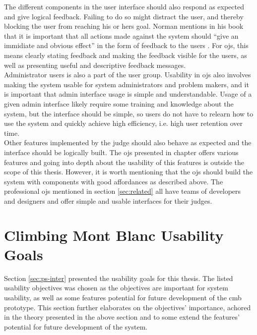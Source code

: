 The different components in the user interface should also respond as expected and give logical feedback. Failing to do so might distract the user, and thereby blocking the user from reaching his or hers goal. Norman mentions in his book that it is important that all actions made against the system should ``give an immidiate and obvious effect'' in the form of feedback to the users \cite{norman1988design}. For \glspl{oj}, this means clearly stating feedback and making the feedback visible for the users, as well as presenting useful and descriptive feedback messages.\\

Administrator users is also a part of the user group. Usability in \glspl{oj} also involves making the system usable for system administrators and problem makers, and it is important that admin interface usage is simple and understandable. Usage of a given admin interface likely require some training and knowledge about the system, but the interface should be simple, so users do not have to relearn how to use the system and quickly achieve high efficiency, i.e. high user retention over time. \\

Other features implemented by the judge should also behave as expected and the interface should be logically built. The \glspl{oj} presented in chapter offers various features and going into depth about the usability of this features is outside the scope of this thesis. However, it is worth mentioning that the \glspl{oj} should build the system with components with good affordances as described above. The professional \glspl{oj} mentioned in section \ref{sec:related} all have teams of developers and designers and offer simple and usable interfaces for their judges.

\section{Climbing Mont Blanc Usability Goals}
\label{sec:cmb-usability}
Section \ref{sec:ps-inter} presented the usability goals for this thesis. The listed usability objectives was chosen as the objectives are important for system usability, as well as some features potential for future development of the \gls{cmb} prototype. This section further elaborates on the objectives' importance, achored in the theory presented in the above section and to some extend the features' potential for future development of the system. \\

